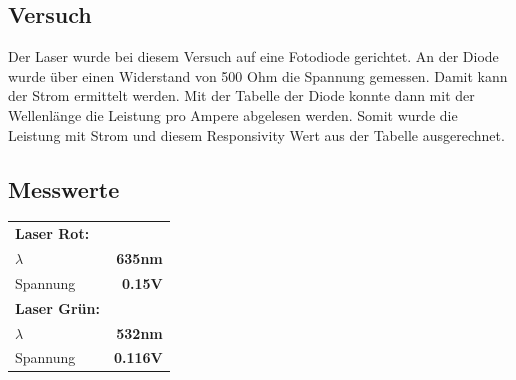 \documentclass{article}
\begin{document}
 \subsection{Versuch}
 Der Laser wurde bei diesem Versuch auf eine Fotodiode gerichtet. An der Diode wurde über einen
 Widerstand von 500 Ohm die Spannung gemessen. Damit kann der Strom ermittelt werden. Mit der
 Tabelle der Diode konnte dann mit der Wellenlänge die Leistung pro Ampere abgelesen werden. Somit
 wurde die Leistung mit Strom und diesem Responsivity Wert aus der Tabelle ausgerechnet.
 \subsection{Messwerte}
 \begin{tabular}{l r}
 	\textbf{Laser Rot:}&\\
 	$\lambda$ & \textbf{635nm}\\
 	Spannung & \textbf{0.15V}\\
 	\textbf{Laser Grün:}&\\
 	$\lambda$ & \textbf{532nm}\\
 	Spannung & \textbf{0.116V}\\
 \end{tabular}
\end{document}
